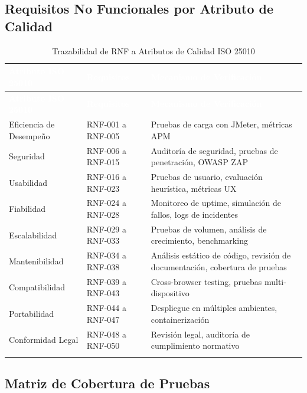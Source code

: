 \documentclass[12pt,a4paper]{article}
\begin{document}
\subsection{Requisitos No Funcionales por Atributo de Calidad}

\begin{longtable}{|>{\raggedright\arraybackslash}p{4cm}|>{\centering\arraybackslash}p{3cm}|>{\raggedright\arraybackslash}p{7cm}|}
\hline
\rowcolor{headercolor}
\textcolor{white}{\textbf{Atributo ISO 25010}} & \textcolor{white}{\textbf{Requisitos}} & \textcolor{white}{\textbf{Mecanismo de Verificación}} \\
\hline
\endfirsthead
\hline
\rowcolor{headercolor}
\textcolor{white}{\textbf{Atributo ISO 25010}} & \textcolor{white}{\textbf{Requisitos}} & \textcolor{white}{\textbf{Mecanismo de Verificación}} \\
\hline
\endhead
\hline
\endlastfoot

Eficiencia de Desempeño & RNF-001 a RNF-005 & Pruebas de carga con JMeter, métricas APM \\
\hline
\rowcolor{rowgray}
Seguridad & RNF-006 a RNF-015 & Auditoría de seguridad, pruebas de penetración, OWASP ZAP \\
\hline
Usabilidad & RNF-016 a RNF-023 & Pruebas de usuario, evaluación heurística, métricas UX \\
\hline
\rowcolor{rowgray}
Fiabilidad & RNF-024 a RNF-028 & Monitoreo de uptime, simulación de fallos, logs de incidentes \\
\hline
Escalabilidad & RNF-029 a RNF-033 & Pruebas de volumen, análisis de crecimiento, benchmarking \\
\hline
\rowcolor{rowgray}
Mantenibilidad & RNF-034 a RNF-038 & Análisis estático de código, revisión de documentación, cobertura de pruebas \\
\hline
Compatibilidad & RNF-039 a RNF-043 & Cross-browser testing, pruebas multi-dispositivo \\
\hline
\rowcolor{rowgray}
Portabilidad & RNF-044 a RNF-047 & Despliegue en múltiples ambientes, containerización \\
\hline
Conformidad Legal & RNF-048 a RNF-050 & Revisión legal, auditoría de cumplimiento normativo \\
\hline
\caption{Trazabilidad de RNF a Atributos de Calidad ISO 25010}
\end{longtable}

\subsection{Matriz de Cobertura de Pruebas}
\end{document}
